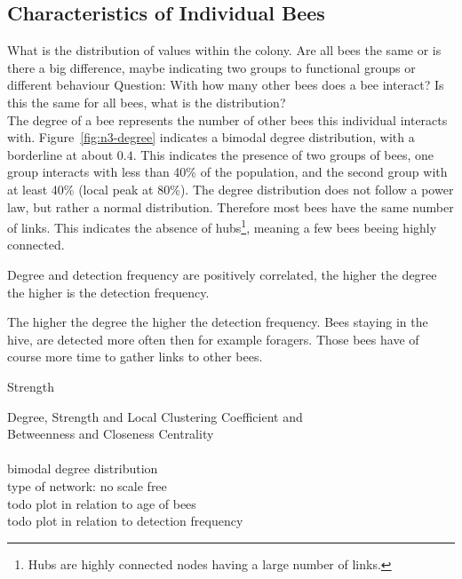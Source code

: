 \subsection{Characteristics of Individual Bees}
What is the distribution of values within the colony.
Are all bees the same or is there a big difference, maybe indicating two groups to functional groups or different behaviour
Question: With how many other bees does a bee interact? Is this the same for all bees, what is the distribution?\\



The degree of a bee represents the number of other bees this individual interacts with.
Figure~\ref{fig:n3-degree} indicates a bimodal degree distribution, with a borderline at about $0.4$. This indicates the presence of two groups of bees, one group interacts with less than 40\% of the population, and the second group with at least 40\% (local peak at 80\%).
The degree distribution does not follow a power law, but rather a normal distribution. Therefore most bees have the same number of links. This indicates the absence of hubs\footnote{Hubs are highly connected nodes having a large number of links.}, meaning a few bees beeing highly connected. 

Degree and detection frequency are positively correlated, the higher the degree the higher is the detection frequency.

The higher the degree the higher the detection frequency. Bees staying in the hive, are detected more often then for example foragers. Those bees have of course more time to gather links to other bees.

Strength


Degree, Strength and Local Clustering Coefficient and \\
Betweenness and Closeness Centrality\\
\\
bimodal degree distribution\\
type of network: no scale free\\
todo plot in relation to age of bees\\
todo plot in relation to detection frequency\\

